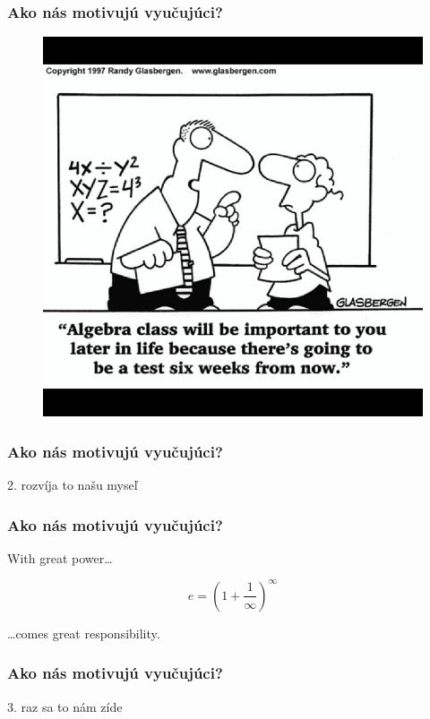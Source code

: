 \documentclass{beamer}
\begin{document}
\begin{frame}
\frametitle{Ako nás motivujú vyučujúci?}
\begin{figure}
\includegraphics[height=0.8\textheight]{images/will_help_in_real_life.jpg}
\end{figure}
\end{frame}

\begin{frame}
\frametitle{Ako nás motivujú vyučujúci?}
\begin{center}
{\Large 2. rozvíja to našu myseľ}
\end{center}
\end{frame}

\begin{frame}
\frametitle{Ako nás motivujú vyučujúci?}
{\Large

\begin{flushleft}
With great power\ldots
\end{flushleft}
$$e = \left(1 + \dfrac{1}{\infty}\right)^{\infty}$$
\begin{flushright}
\ldots comes great responsibility.
\end{flushright}

}
\end{frame}

\begin{frame}
\frametitle{Ako nás motivujú vyučujúci?}
\begin{center}
{\Large 3. raz sa to nám zíde}
\end{center}
\end{frame}
\end{document}

